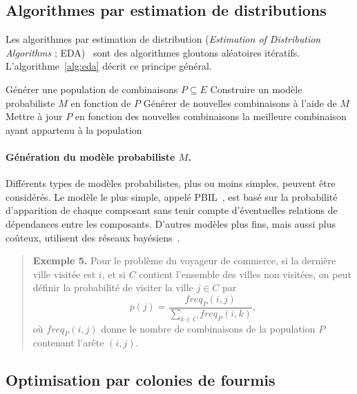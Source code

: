 \documentclass[12pt,a4paper]{book}
\begin{document}
\subsection{Algorithmes par estimation de distributions}
\label{sec:eda}

Les algorithmes par estimation de distribution (\textit{Estimation of Distribution Algorithms} ; EDA)~\cite{larranaga2001} sont des algorithmes gloutons aléatoires itératifs. L'algorithme~\ref{alg:eda} décrit ce principe général.

\begin{algorithm}[ht]
\caption{Algorithmes par estimation de distributions}
\label{alg:eda}
\begin{algorithmic}[1]
\State Générer une population de combinaisons $P \subseteq E$
  \State Construire un modèle probabiliste $M$ en fonction de $P$
  \State Générer de nouvelles combinaisons à l'aide de $M$
  \State Mettre à jour $P$ en fonction des nouvelles combinaisons
\EndWhile
\State \Return la meilleure combinaison ayant appartenu à la population
\end{algorithmic}
\end{algorithm}

\paragraph{Génération du modèle probabiliste $M$.}
Différents types de modèles probabilistes, plus ou moins simples, peuvent être considérés. Le modèle le plus simple, appelé PBIL~\cite{baluja1994}, est basé sur la probabilité d'apparition de chaque composant sans tenir compte d'éventuelles relations de dépendances entre les composants. D'autres modèles plus fins, mais aussi plus coûteux, utilisent des réseaux bayésiens~\cite{pelikan1999}.

\begin{quote}
\textbf{Exemple 5.} Pour le problème du voyageur de commerce, si la dernière ville visitée est $i$, et si $C$ contient l'ensemble des villes non visitées, on peut définir la probabilité de visiter la ville $j \in C$ par
\[
p(j) = \frac{freq_P(i,j)}{\sum_{k \in C} freq_P(i,k)},
\]
où $freq_P(i, j)$ donne le nombre de combinaisons de la population $P$ contenant l'arête $(i, j)$.
\end{quote}

\subsection{Optimisation par colonies de fourmis}
\label{sec:aco}
\end{document}
